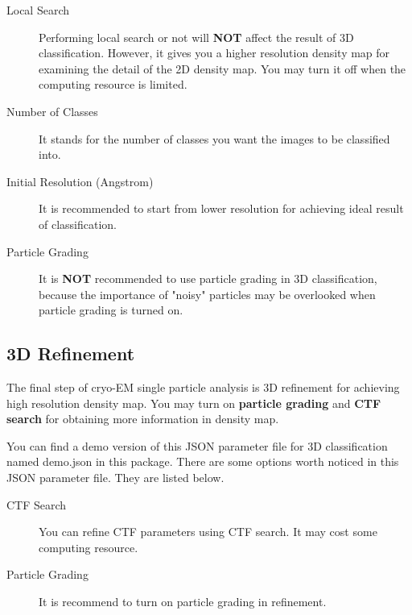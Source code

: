 \documentclass{article}
\begin{document}
        \begin{description}
            \item[Local Search] Performing local search or not will \textbf{NOT} affect the result of 3D classification. However, it gives you a higher resolution density map for examining the detail of the 2D density map. You may turn it off when the computing resource is limited.
            \item[Number of Classes] It stands for the number of classes you want the images to be classified into.
            \item[Initial Resolution (Angstrom)] It is recommended to start from lower resolution for achieving ideal result of classification.
            \item[Particle Grading] It is \textbf{NOT} recommended to use particle grading in 3D classification, because the importance of "noisy" particles may be overlooked when particle grading is turned on.
        \end{description}
        
        \subsection{3D Refinement}
        
        The final step of cryo-EM single particle analysis is 3D refinement for achieving high resolution density map. You may turn on \textbf{particle grading} and \textbf{CTF search} for obtaining more information in density map.
                
        You can find a demo version of this JSON parameter file for 3D classification named \textsf{demo.json} in this package. There are some options worth noticed in this JSON parameter file. They are listed below.
        
        \begin{description}
            \item[CTF Search] You can refine CTF parameters using CTF search. It may cost some computing resource.
            \item[Particle Grading] It is recommend to turn on particle grading in refinement.
        \end{description}
        
\end{document}
